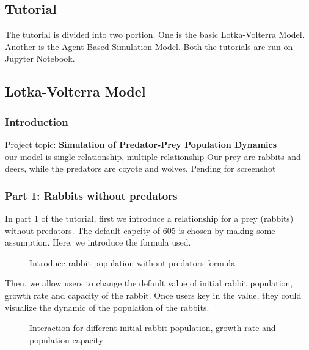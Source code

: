 \documentclass{article}
\begin{document}
\begin{normalsize}
		\section{Tutorial}
		The tutorial is divided into two portion. One is the basic Lotka-Volterra Model. Another is the Agent Based Simulation Model. Both the tutorials are run on Jupyter Notebook.
		\subsection{Lotka-Volterra Model}
		\subsubsection{Introduction}
		Project topic: \textbf{Simulation of Predator-Prey Population Dynamics }\\
		our model is single relationship, multiple relationship Our prey are rabbits and deers, while the predators are coyote and wolves.
		Pending for screenshot
		\subsubsection{Part 1: Rabbits without predators}
		In part 1 of the tutorial, first we introduce a relationship for a prey (rabbits) without predators. The default capcity of 605 is chosen by making some assumption. Here, we introduce the formula used. 
			\begin{figure}[H]
			\caption{Introduce rabbit population without predators formula}
			\end{figure}
		
		Then, we allow users to change the default value of initial rabbit population,  growth rate and capacity of the rabbit. Once users key in the value, they could visualize the dynamic of the population of the rabbits.
		\begin{figure}[H]
			\caption{Interaction for different initial rabbit population, growth rate and population capacity }
		\end{figure}
		

\end{normalsize}
\end{document}

